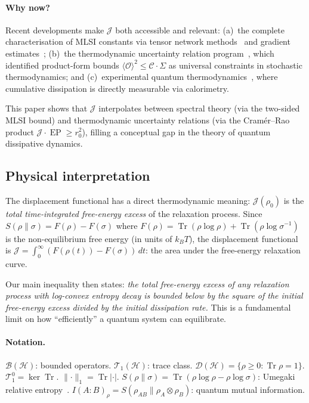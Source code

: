 \documentclass[11pt,a4paper]{article}
\theoremstyle{definition}
\theoremstyle{remark}
\DeclareMathOperator{\Tr}{Tr}
\DeclareMathOperator{\EP}{EP}
\newcommand{\HH}{\mathcal{H}}
\newcommand{\BB}{\mathcal{B}}
\newcommand{\DD}{\mathcal{D}}
\newcommand{\TT}{\mathcal{T}}
\newcommand{\norm}[1]{\lVert #1 \rVert}
\begin{document}
\paragraph{Why now?}
Recent developments make $\mathcal{J}$ both accessible and relevant:
(a)~the complete characterisation of MLSI constants via tensor 
network methods~\cite{Bardet2024} and gradient estimates~\cite{CarlenMaas2017}; 
(b)~the thermodynamic uncertainty relation program~\cite{Barato2015,Horowitz2020}, 
which identified product-form bounds $\langle \mathcal{O}\rangle^2 \le 
\mathcal{C} \cdot \Sigma$ as universal constraints in stochastic 
thermodynamics; and (c)~experimental quantum thermodynamics~\cite{Schmiegelow2016,Peterson2019}, 
where cumulative dissipation is directly measurable via calorimetry.

This paper shows that $\mathcal{J}$ interpolates between spectral 
theory (via the two-sided MLSI bound) and thermodynamic uncertainty 
relations (via the Cram\'er--Rao product $\mathcal{J}\cdot\EP \ge r_0^2$), 
filling a conceptual gap in the theory of quantum dissipative dynamics.

\subsection{Physical interpretation}

The displacement functional has a direct thermodynamic meaning:
$\mathcal{J}(\rho_0)$ is the \emph{total time-integrated free-energy
excess} of the relaxation process.  Since
$S(\rho\|\sigma) = F(\rho) - F(\sigma)$ where
$F(\rho) = \Tr(\rho\log\rho) + \Tr(\rho\log\sigma^{-1})$ is the
non-equilibrium free energy (in units of $k_BT$), the displacement
functional is
$\mathcal{J} = \int_0^\infty (F(\rho(t)) - F(\sigma))\,dt$:
the area under the free-energy relaxation curve.

Our main inequality then states: \emph{the total free-energy excess
of any relaxation process with log-convex entropy decay is bounded
below by the square of the initial free-energy excess divided by
the initial dissipation rate.}
This is a fundamental limit on how ``efficiently'' a quantum system
can equilibrate.

\paragraph{Notation.}
$\BB(\HH)$: bounded operators.  $\TT_1(\HH)$: trace class.
$\DD(\HH) = \{\rho \ge 0 : \Tr\rho = 1\}$.
$\TT_1^0 = \ker\Tr$.  $\norm{\cdot}_1 = \Tr|\cdot|$.
$S(\rho\|\sigma) = \Tr(\rho\log\rho - \rho\log\sigma)$:
Umegaki relative entropy~\cite{Umegaki1962,Araki1976}.
$I(A\!:\!B)_\rho = S(\rho_{AB}\|\rho_A\otimes\rho_B)$:
quantum mutual information.
\end{document}
